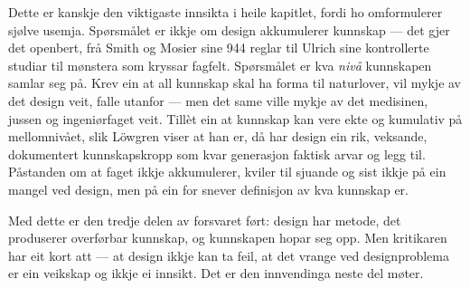 Dette er kanskje den viktigaste innsikta i heile kapitlet, fordi ho omformulerer sjølve usemja. Spørsmålet er ikkje om design akkumulerer kunnskap — det gjer det openbert, frå Smith og Mosier sine 944 reglar til Ulrich sine kontrollerte studiar til mønstera som kryssar fagfelt. Spørsmålet er kva \emph{nivå} kunnskapen samlar seg på. Krev ein at all kunnskap skal ha forma til naturlover, vil mykje av det design veit, falle utanfor — men det same ville mykje av det medisinen, jussen og ingeniørfaget veit. Tillèt ein at kunnskap kan vere ekte og kumulativ på mellomnivået, slik Löwgren viser at han er, då har design ein rik, veksande, dokumentert kunnskapskropp som kvar generasjon faktisk arvar og legg til. Påstanden om at faget ikkje akkumulerer, kviler til sjuande og sist ikkje på ein mangel ved design, men på ein for snever definisjon av kva kunnskap er.

\vignett

Med dette er den tredje delen av forsvaret ført: design har metode, det produserer overførbar kunnskap, og kunnskapen hopar seg opp. Men kritikaren har eit kort att — at design ikkje kan ta feil, at det vrange ved designproblema er ein veikskap og ikkje ei innsikt. Det er den innvendinga neste del møter.

